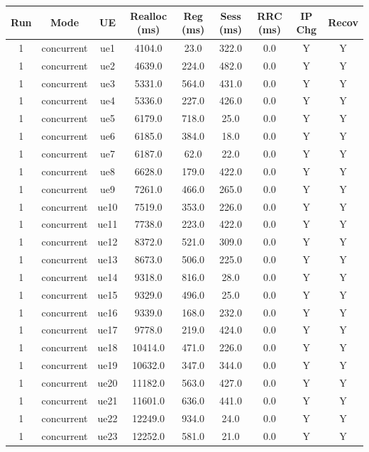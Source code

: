 \begin{table}[ht]
\centering
\begin{tabular}{|c|c|c|c|c|c|c|c|c|}
\hline
Run & Mode & UE & Realloc (ms) & Reg (ms) & Sess (ms) & RRC (ms) & IP Chg & Recov \\
\hline
1 & concurrent & ue1 & 4104.0 & 23.0 & 322.0 & 0.0 & Y & Y \\
1 & concurrent & ue2 & 4639.0 & 224.0 & 482.0 & 0.0 & Y & Y \\
1 & concurrent & ue3 & 5331.0 & 564.0 & 431.0 & 0.0 & Y & Y \\
1 & concurrent & ue4 & 5336.0 & 227.0 & 426.0 & 0.0 & Y & Y \\
1 & concurrent & ue5 & 6179.0 & 718.0 & 25.0 & 0.0 & Y & Y \\
1 & concurrent & ue6 & 6185.0 & 384.0 & 18.0 & 0.0 & Y & Y \\
1 & concurrent & ue7 & 6187.0 & 62.0 & 22.0 & 0.0 & Y & Y \\
1 & concurrent & ue8 & 6628.0 & 179.0 & 422.0 & 0.0 & Y & Y \\
1 & concurrent & ue9 & 7261.0 & 466.0 & 265.0 & 0.0 & Y & Y \\
1 & concurrent & ue10 & 7519.0 & 353.0 & 226.0 & 0.0 & Y & Y \\
1 & concurrent & ue11 & 7738.0 & 223.0 & 422.0 & 0.0 & Y & Y \\
1 & concurrent & ue12 & 8372.0 & 521.0 & 309.0 & 0.0 & Y & Y \\
1 & concurrent & ue13 & 8673.0 & 506.0 & 225.0 & 0.0 & Y & Y \\
1 & concurrent & ue14 & 9318.0 & 816.0 & 28.0 & 0.0 & Y & Y \\
1 & concurrent & ue15 & 9329.0 & 496.0 & 25.0 & 0.0 & Y & Y \\
1 & concurrent & ue16 & 9339.0 & 168.0 & 232.0 & 0.0 & Y & Y \\
1 & concurrent & ue17 & 9778.0 & 219.0 & 424.0 & 0.0 & Y & Y \\
1 & concurrent & ue18 & 10414.0 & 471.0 & 226.0 & 0.0 & Y & Y \\
1 & concurrent & ue19 & 10632.0 & 347.0 & 344.0 & 0.0 & Y & Y \\
1 & concurrent & ue20 & 11182.0 & 563.0 & 427.0 & 0.0 & Y & Y \\
1 & concurrent & ue21 & 11601.0 & 636.0 & 441.0 & 0.0 & Y & Y \\
1 & concurrent & ue22 & 12249.0 & 934.0 & 24.0 & 0.0 & Y & Y \\
1 & concurrent & ue23 & 12252.0 & 581.0 & 21.0 & 0.0 & Y & Y \\

\end{tabular}
\end{table}
